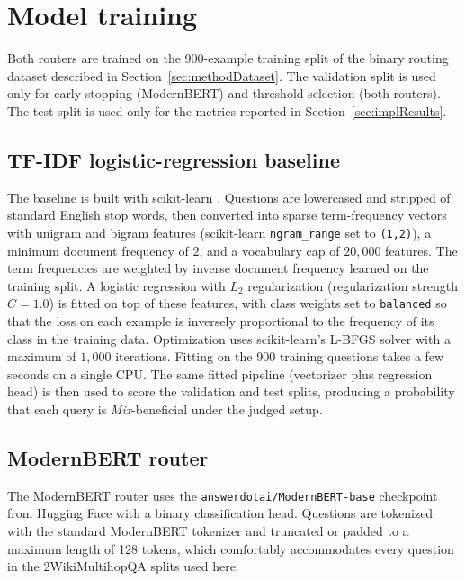 \documentclass[english, bibtex]{kththesis}               %
\numberwithin{listing}{chapter}
\begin{document}
\section{Model training}
\label{sec:implTraining}

Both routers are trained on the 900-example training split of the binary routing dataset described in Section~\ref{sec:methodDataset}. The validation split is used only for early stopping (ModernBERT) and threshold selection (both routers). The test split is used only for the metrics reported in Section~\ref{sec:implResults}.

\subsection{TF-IDF logistic-regression baseline}
\label{sec:implTfidf}

The baseline is built with scikit-learn \cite{pedregosa2011scikit}. Questions are lowercased and stripped of standard English stop words, then converted into sparse term-frequency vectors with unigram and bigram features (scikit-learn \texttt{ngram\_range} set to \texttt{(1,2)}), a minimum document frequency of $2$, and a vocabulary cap of $20{,}000$ features. The term frequencies are weighted by inverse document frequency \cite{salton1988termweighting} learned on the training split. A logistic regression with $L_2$ regularization (regularization strength $C=1.0$) is fitted on top of these features, with class weights set to \texttt{balanced} so that the loss on each example is inversely proportional to the frequency of its class in the training data. Optimization uses scikit-learn's L-BFGS solver \cite{liu1989limited} with a maximum of $1{,}000$ iterations. Fitting on the 900 training questions takes a few seconds on a single CPU. The same fitted pipeline (vectorizer plus regression head) is then used to score the validation and test splits, producing a probability that each query is \emph{Mix}-beneficial under the judged setup.

\subsection{ModernBERT router}
\label{sec:implModernBert}

The ModernBERT router uses the \texttt{answerdotai/ModernBERT-base} checkpoint from Hugging Face \cite{warner2024modernbert} with a binary classification head. Questions are tokenized with the standard ModernBERT tokenizer and truncated or padded to a maximum length of 128 tokens, which comfortably accommodates every question in the 2WikiMultihopQA splits used here.
\end{document}
